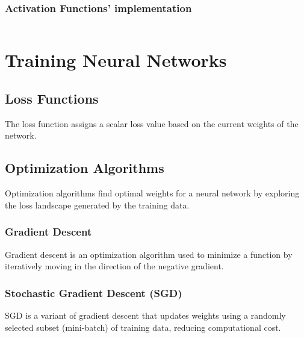 \documentclass[a4paper,12pt]{article}
\begin{document}
\subsubsection{Activation Functions' implementation}
\inputminted[frame=lines, fontsize=\tiny, linenos]{python}{../../blue/activation_functions/activation_functions.py}

\section{Training Neural Networks}

\subsection{Loss Functions}
\begin{tcolorbox}[colback=blue!5!white,colframe=blue!75!black,title=Loss Function]
  The loss function assigns a scalar loss value based on the current weights of the network.
\end{tcolorbox}

\subsection{Optimization Algorithms}
Optimization algorithms find optimal weights for a neural network by exploring the loss
landscape generated by the training data.

\subsubsection{Gradient Descent}
\begin{tcolorbox}[colback=blue!5!white,colframe=blue!75!black,title=Gradient Descent]
  Gradient descent is an optimization algorithm used to minimize a function by iteratively moving in the direction of
  the negative gradient.
\end{tcolorbox}

\subsubsection{Stochastic Gradient Descent (SGD)}
\begin{tcolorbox}[colback=blue!5!white,colframe=blue!75!black,title=Stochastic Gradient Descent]
  SGD is a variant of gradient descent that updates weights using a randomly selected subset (mini-batch) of
  training data, reducing computational cost.
\end{tcolorbox}
\end{document}
